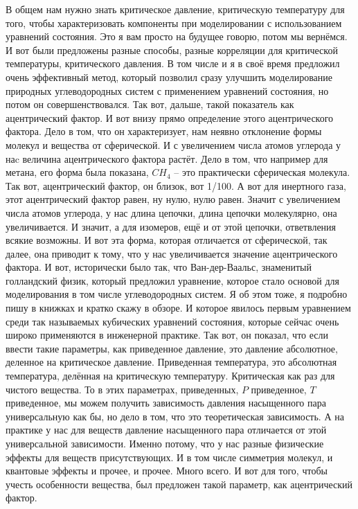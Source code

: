 \documentclass[main.tex]{subfiles}
\begin{document}
В общем нам нужно знать критическое давление, критическую температуру для того, чтобы характеризовать компоненты при моделировании с использованием уравнений состояния.
Это я вам просто на будущее говорю, потом мы вернёмся.
И вот были предложены разные способы, разные корреляции для критической температуры, критического давления.
В том числе и я в своё время предложил очень эффективный метод, который позволил сразу улучшить моделирование природных углеводородных систем с применением уравнений состояния, но потом он совершенствовался.
Так вот, дальше, такой показатель как ацентрический фактор.
И вот внизу прямо определение этого ацентрического фактора.
Дело в том, что он характеризует, нам неявно отклонение формы молекул и вещества от сферической.
И с увеличением числа атомов углерода у наc величина ацентрического фактора растёт.
Дело в том, что например для метана, его форма была показана, $CH_4$ -- это практически сферическая молекула.
Так вот, ацентрический фактор, он близок, вот 1/100.
А вот для инертного газа, этот ацентрический фактор равен, ну нулю, нулю равен.
Значит с увеличением числа атомов углерода, у нас длина цепочки, длина цепочки молекулярно, она увеличивается.
И значит, а для изомеров, ещё и от этой цепочки, ответвления всякие возможны.
И вот эта форма, которая отличается от сферической, так далее, она приводит к тому, что у нас увеличивается значение ацентрического фактора.
И вот, исторически было так, что Ван-дер-Ваальс, знаменитый голландский физик, который предложил уравнение, которое стало основой для моделирования в том числе углеводородных систем.
Я об этом тоже, я подробно пишу в книжках и кратко скажу в обзоре.
И которое явилось первым уравнением среди так называемых кубических уравнений состояния, которые сейчас очень широко применяются в инженерной практике.
Так вот, он показал, что если ввести такие параметры, как приведенное давление, это давление абсолютное, деленное на критическое давление.
Приведенная температура, это абсолютная температура, делённая на критическую температуру.
Критическая как раз для чистого вещества.
То в этих параметрах, приведенных, $P$ приведенное, $T$ приведенное, мы можем получить зависимость давления насыщенного пара универсальную как бы, но дело в том, что это теоретическая зависимость.
А на практике у нас для веществ давление насыщенного пара отличается от этой универсальной зависимости.
Именно потому, что у нас разные физические эффекты для веществ присутствующих.
И в том числе симметрия молекул, и квантовые эффекты и прочее, и прочее.
Много всего.
И вот для того, чтобы учесть особенности вещества, был предложен такой параметр, как ацентрический фактор.
\end{document}
